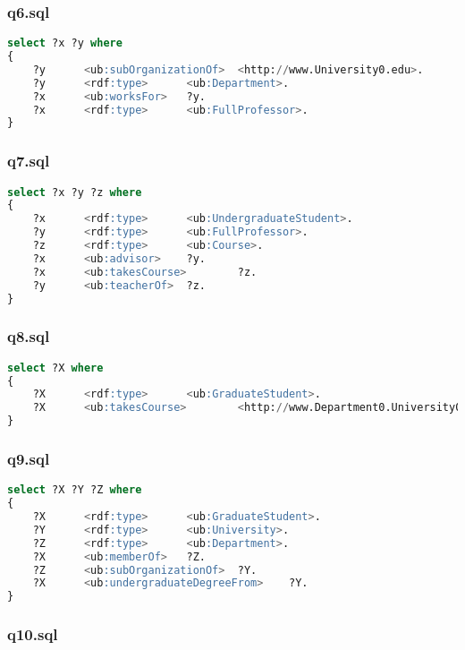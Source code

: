 \documentclass[titlepage, a4paper, 12pt] {article}
\begin{document}
\subsubsection{q6.sql}

\begin{lstlisting}[language=SQL]
select ?x ?y where
{
	?y      <ub:subOrganizationOf>  <http://www.University0.edu>.
	?y      <rdf:type>      <ub:Department>.
	?x      <ub:worksFor>   ?y.
	?x      <rdf:type>      <ub:FullProfessor>.
}
\end{lstlisting}

\subsubsection{q7.sql}

\begin{lstlisting}[language=SQL]
select ?x ?y ?z where
{
	?x      <rdf:type>      <ub:UndergraduateStudent>.
	?y      <rdf:type>      <ub:FullProfessor>.
	?z      <rdf:type>      <ub:Course>.
	?x      <ub:advisor>    ?y.
	?x      <ub:takesCourse>        ?z.
	?y      <ub:teacherOf>  ?z.
}
\end{lstlisting}

\subsubsection{q8.sql}

\begin{lstlisting}[language=SQL]
select ?X where
{
	?X      <rdf:type>      <ub:GraduateStudent>.
	?X      <ub:takesCourse>        <http://www.Department0.University0.edu/GraduateCourse0>.
}
\end{lstlisting}

\subsubsection{q9.sql}

\begin{lstlisting}[language=SQL]
select ?X ?Y ?Z where
{
	?X      <rdf:type>      <ub:GraduateStudent>.
	?Y      <rdf:type>      <ub:University>.
	?Z      <rdf:type>      <ub:Department>.
	?X      <ub:memberOf>   ?Z.
	?Z      <ub:subOrganizationOf>  ?Y.
	?X      <ub:undergraduateDegreeFrom>    ?Y.
}    
\end{lstlisting}

\subsubsection{q10.sql}
\end{document}
